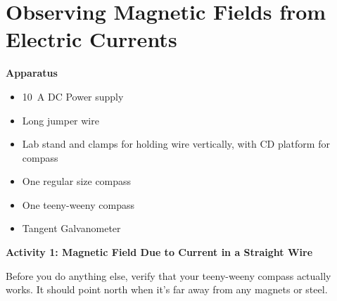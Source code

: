 \section{Observing Magnetic Fields from Electric Currents}


\makelabheader %

\bigskip
\textbf{Apparatus} 

\begin{itemize} [nosep]
\item 10~A DC Power supply
\item Long jumper wire 
\item Lab stand and clamps for holding wire vertically, with CD platform for compass
\item One regular size compass
\item One teeny-weeny compass
\item Tangent Galvanometer
\end{itemize}

\bigskip
\textbf{Activity 1: Magnetic Field Due to Current in a Straight Wire}

Before you do anything else, verify that your teeny-weeny compass actually works.  It should point north when it's far away from any magnets or steel.  

